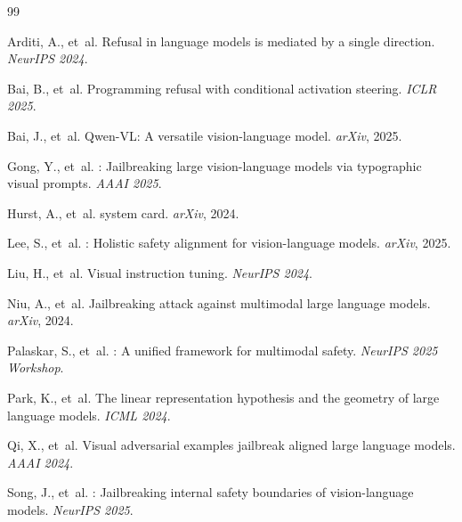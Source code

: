 \documentclass{article}
\begin{document}
\begin{thebibliography}{99}

Arditi, A., et~al.
\newblock Refusal in language models is mediated by a single direction.
\newblock \emph{NeurIPS 2024}.

Bai, B., et~al.
\newblock Programming refusal with conditional activation steering.
\newblock \emph{ICLR 2025}.

Bai, J., et~al.
\newblock Qwen-{VL}: A versatile vision-language model.
\newblock \emph{arXiv}, 2025.

Gong, Y., et~al.
: Jailbreaking large vision-language models via typographic
  visual prompts.
\newblock \emph{AAAI 2025}.

Hurst, A., et~al.
 system card.
\newblock \emph{arXiv}, 2024.

Lee, S., et~al.
: Holistic safety alignment for vision-language models.
\newblock \emph{arXiv}, 2025.

Liu, H., et~al.
\newblock Visual instruction tuning.
\newblock \emph{NeurIPS 2024}.

Niu, A., et~al.
\newblock Jailbreaking attack against multimodal large language models.
\newblock \emph{arXiv}, 2024.

Palaskar, S., et~al.
: A unified framework for multimodal safety.
\newblock \emph{NeurIPS 2025 Workshop}.

Park, K., et~al.
\newblock The linear representation hypothesis and the geometry of large
  language models.
\newblock \emph{ICML 2024}.

Qi, X., et~al.
\newblock Visual adversarial examples jailbreak aligned large language models.
\newblock \emph{AAAI 2024}.

Song, J., et~al.
: Jailbreaking internal safety boundaries of
  vision-language models.
\newblock \emph{NeurIPS 2025}.


\end{thebibliography}
\end{document}

